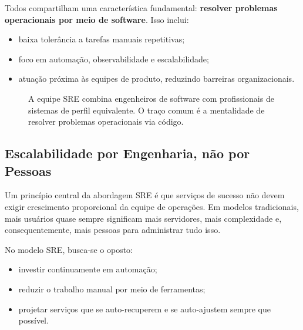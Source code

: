 \documentclass[12pt,a4paper]{report}
\begin{document}
Todos compartilham uma característica fundamental: \textbf{resolver problemas
operacionais por meio de software}. Isso inclui:
\begin{itemize}[nosep]
    \item baixa tolerância a tarefas manuais repetitivas;
    \item foco em automação, observabilidade e escalabilidade;
    \item atuação próxima às equipes de produto, reduzindo barreiras
    organizacionais.
\end{itemize}

\begin{figure}[h]
    \centering
    \caption{A equipe SRE combina engenheiros de software com profissionais de sistemas de perfil equivalente. O traço comum é a mentalidade de resolver problemas operacionais via código.}
\end{figure}

\subsection{Escalabilidade por Engenharia, não por Pessoas}

Um princípio central da abordagem SRE é que serviços de sucesso não devem
exigir crescimento proporcional da equipe de operações. Em modelos
tradicionais, mais usuários quase sempre significam mais servidores, mais
complexidade e, consequentemente, mais pessoas para administrar tudo isso.

No modelo SRE, busca-se o oposto:
\begin{itemize}[nosep]
    \item investir continuamente em automação;
    \item reduzir o trabalho manual por meio de ferramentas;
    \item projetar serviços que se auto-recuperem e se auto-ajustem sempre que
    possível.
\end{itemize}
\end{document}
